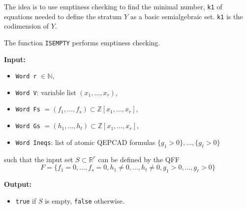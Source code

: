 \documentclass[
]{book}
\providecommand{\tightlist}{%
  \setlength{\itemsep}{0pt}\setlength{\parskip}{0pt}}
\theoremstyle{definition}
\theoremstyle{definition}
\theoremstyle{definition}
\theoremstyle{definition}
\theoremstyle{remark}
\begin{document}
The idea is to use emptiness checking to find the minimal number, \texttt{k1} of equations needed to define the stratum \(Y\) as a basic semialgebraic set. \texttt{k1} is the codimension of \(Y\).

The function \texttt{ISEMPTY} performs emptiness checking.

\textbf{Input:}

\begin{itemize}
\tightlist
\item
  \texttt{Word\ r} \(\in \mathbb{N}\),
\item
  \texttt{Word\ V}: variable list \((x_1,\ldots,x_r)\),
\item
  \texttt{Word\ Fs} \(= (f_1,\ldots,f_s) \subset \mathbb{Z}[x_1,\ldots,x_r]\),
\item
  \texttt{Word\ Gs} \(= (h_1,\ldots,h_t) \subset \mathbb{Z}[x_1,\ldots,x_r]\),
\item
  \texttt{Word\ Ineqs}: list of atomic QEPCAD formulas \(\{ g_1 > 0 \},\ldots,\{ g_\ell > 0 \}\)
\end{itemize}

such that the input set \(S \subset \mathbb{R}^r\) can be defined by the QFF
\[
F = \{ f_1 = 0,\ldots,f_s = 0, h_1 \ne 0,\ldots,h_t \ne 0, g_1 > 0,\ldots,g_\ell > 0 \}
\]

\textbf{Output:}

\begin{itemize}
\tightlist
\item
  \texttt{true} if \(S\) is empty, \texttt{false} otherwise.
\end{itemize}
\end{document}
